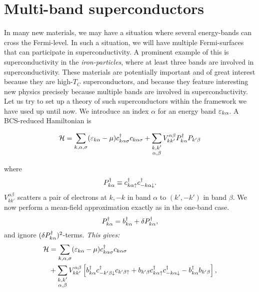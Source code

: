 
\section{Multi-band superconductors}

In many new materials, we may have a situation where several energy-bands can cross the Fermi-level. In such a situation, we will have multiple Fermi-surfaces that can participate in superconductivity. A prominent example of this is superconductivity in the \emph{iron-particles}, where at least three bands are involved in superconductivity. These materials are potentially important and of great interest because they  are high-$T_C$ superconductors, and because they feature interesting new physics precisely because multiple bands are involved in superconductivity. Let us try to set up a theory of such superconductors within the framework we have used up until now. We introduce an index $\alpha$ for an energy band $\varepsilon_{k\alpha}$.
A BCS-reduced Hamiltonian is
\begin{tcolorbox}
	\begin{equation}		
		\mathcal{H} =
		 \sum_{k,\alpha, \sigma}(\varepsilon_{k\alpha}-\mu)c^{\dagger}_{k\alpha\sigma}c_{k\alpha\sigma}
		+ \sum_{\substack{k,k' \\ \alpha,\beta}}V_{kk'}^{\alpha\beta}P_{k\alpha}^{\dagger}P_{k'\beta}
	\end{equation}
\end{tcolorbox}
where 
\begin{equation}
	P_{k\alpha}^{\dagger} \equiv c^{\dagger}_{k\alpha\uparrow}c^{\dagger}_{-k\alpha\downarrow}.
\end{equation}
$V_{kk'}^{\alpha\beta}$ scatters a pair of electrons at $k,-k$ in band $\alpha$ to $(k', -k')$ in band $\beta$.
We now perform a mean-field approximation exactly as in the one-band case.
\begin{equation}
	P_{k\alpha}^{\dagger} = b_{k\alpha}^{\dagger} + \delta P_{k\alpha}^{\dagger},
\end{equation}
and ignore $(\delta P_{k\alpha}^{\dagger})^2$-terms.
\emph{This gives:}
\begin{equation}
\begin{aligned}
	\mathcal{H} &= \sum_{k,\alpha, \sigma}(\varepsilon_{k\alpha}-\mu)c^{\dagger}_{k\alpha\sigma}c_{k\alpha\sigma} \\
	& + \sum_{\substack{k,k' \\ \alpha,\beta}}V_{kk'}^{\alpha\beta}\left [ b_{k\alpha}^{\dagger}c^{\dagger}_{-k'\beta\downarrow}c_{k'\beta\uparrow}  +  b_{k'\beta}c^{\dagger}_{k\alpha\uparrow}c^{\dagger}_{-k\alpha\downarrow} - b_{k\alpha}^{\dagger}b_{k'\beta}\right ],
\end{aligned}
\end{equation}
